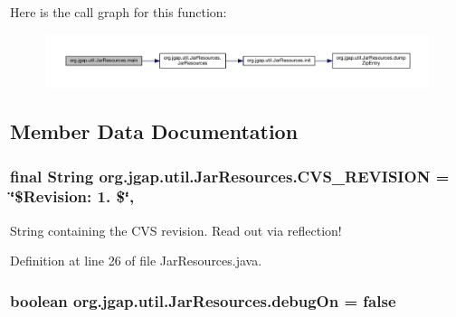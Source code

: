 Here is the call graph for this function\-:
\nopagebreak
\begin{figure}[H]
\begin{center}
\leavevmode
\includegraphics[width=350pt]{classorg_1_1jgap_1_1util_1_1_jar_resources_a968a933bc152943b2061e18bcdf47638_cgraph}
\end{center}
\end{figure}




\subsection{Member Data Documentation}
\hypertarget{classorg_1_1jgap_1_1util_1_1_jar_resources_a833854120ecb90e29a530677d1a56614}{
\subsubsection[{C\-V\-S\-\_\-\-R\-E\-V\-I\-S\-I\-O\-N}]{\setlength{\rightskip}{0pt plus 5cm}final String org.\-jgap.\-util.\-Jar\-Resources.\-C\-V\-S\-\_\-\-R\-E\-V\-I\-S\-I\-O\-N = \char`\"{}\$Revision\-: 1. \$\char`\"{}\hspace{0.3cm}{\ttfamily [static]}, {\ttfamily [private]}}}\label{classorg_1_1jgap_1_1util_1_1_jar_resources_a833854120ecb90e29a530677d1a56614}
String containing the C\-V\-S revision. Read out via reflection! 

Definition at line 26 of file Jar\-Resources.\-java.

\hypertarget{classorg_1_1jgap_1_1util_1_1_jar_resources_a6fb6af86133aedc3f98c20a8b9c2e7cb}{
\subsubsection[{debug\-On}]{\setlength{\rightskip}{0pt plus 5cm}boolean org.\-jgap.\-util.\-Jar\-Resources.\-debug\-On = false}}\label{classorg_1_1jgap_1_1util_1_1_jar_resources_a6fb6af86133aedc3f98c20a8b9c2e7cb}


